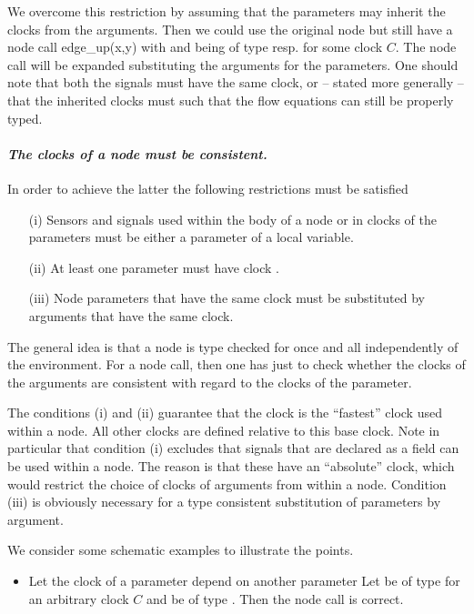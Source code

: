 {We overcome this restriction by assuming that the parameters may inherit
the clocks from the arguments. Then we could use the original node 
\emph{} but still have a node call
%
\BEP
edge\_up(x,y)
\EEP
%
with \emph{} and \emph{} being of type \emph{} resp.
\emph{} for some clock $C$.
The node call will be expanded substituting the arguments for the parameters. 
One should note that both the signals must have the 
same clock, or -- stated more generally -- that the inherited clocks
must such that the flow equations can still be properly typed.

\paragraph{\textit{The clocks of a node must be consistent.}} In order to achieve the latter the following restrictions must be satisfied
\begin{enumerate}
\item[(i)] Sensors and signals used within the body of a node or in clocks of the parameters must be either a parameter of a local variable.

\item[(ii)] At least one parameter must have clock \emph{}.

\item[(iii)] Node parameters that have the same clock must be substituted
by arguments that have the same clock.
\end{enumerate}
The general idea is that a node is type checked for once and all independently of the environment. For a node call, then one has just to
check whether the clocks of the arguments are consistent with regard
to the clocks of the parameter. 

The conditions (i) and (ii) guarantee that the clock \emph{} is the
``fastest'' clock used within a node. All other clocks are defined relative
to this base clock. Note in particular that condition (i) excludes that signals that are declared as a field can be used within a node. The reason is that these have an ``absolute'' clock, which would restrict the choice of clocks of arguments from within a node. Condition (iii) is obviously necessary for a type consistent substitution of parameters by argument.

We consider some schematic examples to illustrate the points.
\begin{itemize}
\item Let the clock of a parameter depend on another parameter
%
%
Let \emph{} be of type \emph{} for an
arbitrary clock $C$
and \emph{} be of type \emph{}.
Then the node call \emph{} is correct.


\end{itemize}}
